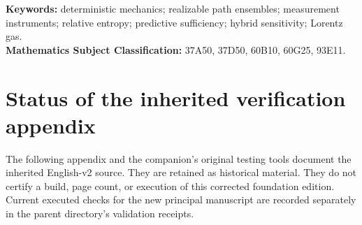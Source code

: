 \documentclass[11pt,a4paper]{article}
\theoremstyle{definition}
\theoremstyle{remark}\newtheorem{remark}[theorem]{Remark}
\begin{document}
\noindent\textbf{Keywords:} deterministic mechanics; realizable path ensembles; measurement instruments; relative entropy; predictive sufficiency; hybrid sensitivity; Lorentz gas.\\
\textbf{Mathematics Subject Classification:} 37A50, 37D50, 60B10, 60G25, 93E11.
\newpage
\setcounter{tocdepth}{1}
\tableofcontents
\newpage




















\appendix



\section*{Status of the inherited verification appendix}
The following appendix and the companion's original testing tools document the inherited English-v2 source. They are retained as historical material. They do not certify a build, page count, or execution of this corrected foundation edition. Current executed checks for the new principal manuscript are recorded separately in the parent directory's validation receipts.


\end{document}
